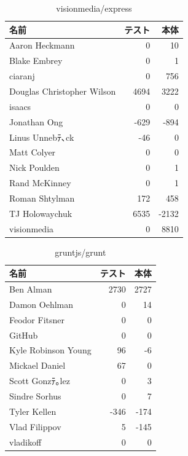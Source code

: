 \begin{table}[htb]
\begin{center}
\caption{visionmedia/express}
\begin{tabular}{|l|r|r|} \hline 
名前 & テスト & 本体 \\ \hline \hline
Aaron Heckmann & 0 & 10\\ \hline
Blake Embrey & 0 & 1\\ \hline
ciaranj & 0 & 756\\ \hline
Douglas Christopher Wilson & 4694 & 3222\\ \hline
isaacs & 0 & 0\\ \hline
Jonathan Ong & -629 & -894\\ \hline
Linus Unnebﾃ､ck & -46 & 0\\ \hline
Matt Colyer & 0 & 0\\ \hline
Nick Poulden & 0 & 1\\ \hline
Rand McKinney & 0 & 1\\ \hline
Roman Shtylman & 172 & 458\\ \hline
TJ Holowaychuk & 6535 & -2132\\ \hline
visionmedia & 0 & 8810\\ \hline
\end{tabular}
\end{center}
\end{table}

\begin{table}[htb]
\begin{center}
\caption{gruntjs/grunt}
\begin{tabular}{|l|r|r|} \hline 
名前 & テスト & 本体 \\ \hline \hline
Ben Alman & 2730 & 2727\\ \hline
Damon Oehlman & 0 & 14\\ \hline
Feodor Fitsner & 0 & 0\\ \hline
GitHub & 0 & 0\\ \hline
Kyle Robinson Young & 96 & -6\\ \hline
Mickael Daniel & 67 & 0\\ \hline
Scott Gonzﾃ｡lez & 0 & 3\\ \hline
Sindre Sorhus & 0 & 7\\ \hline
Tyler Kellen & -346 & -174\\ \hline
Vlad Filippov & 5 & -145\\ \hline
vladikoff & 0 & 0\\ \hline
\end{tabular}
\end{center}
\end{table}

